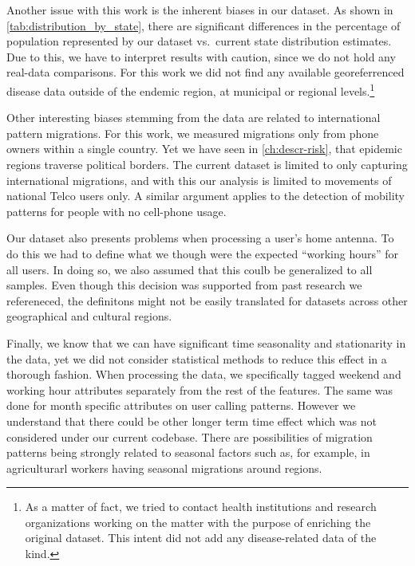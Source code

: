 Another issue with this work is the inherent biases in our dataset.
As shown in \cref{tab:distribution_by_state}, there are significant differences in the percentage of population represented by our dataset vs.\ current state distribution estimates.
Due to this, we have to interpret results with caution, since we do not hold any real-data comparisons.
For this work we did not find any available georeferrenced disease data outside of the endemic region, at municipal or regional levels.\footnote{As a matter of fact, we tried to contact health institutions and research organizations working on the matter with the purpose of enriching the original dataset.
This intent did not add any disease-related data of the kind.}

Other interesting biases stemming from the data are related to international pattern migrations.
For this work, we measured migrations only from phone owners within a single country.
Yet we have seen in \cref{ch:descr-risk}, that  epidemic regions traverse political borders.
The current dataset is limited to only capturing international migrations, and with this our analysis is limited to movements of national Telco users only.
A similar argument applies to the detection of mobility patterns for people with no cell-phone usage.

Our dataset also presents problems when processing a user's home antenna.
To do this we had to define what we though were the expected ``working hours'' for all users.
In doing so, we also assumed that this coulb be generalized to all samples. %
Even though this decision was supported from past research we refereneced, the definitons might not be easily translated for datasets across other geographical and cultural regions.


Finally, we know that we can have significant time seasonality and stationarity in the data, yet we did not consider statistical methods to reduce this effect in a thorough fashion. %
When processing the data, we specifically tagged weekend and working hour attributes separately from the rest of the features.
The same was done for month specific attributes on user calling patterns.
However we understand that there could be other longer term time effect which was not considered under our current codebase. %
There are possibilities of migration patterns being strongly related to seasonal factors such as, for example, in agriculturarl workers having seasonal migrations around regions.%

